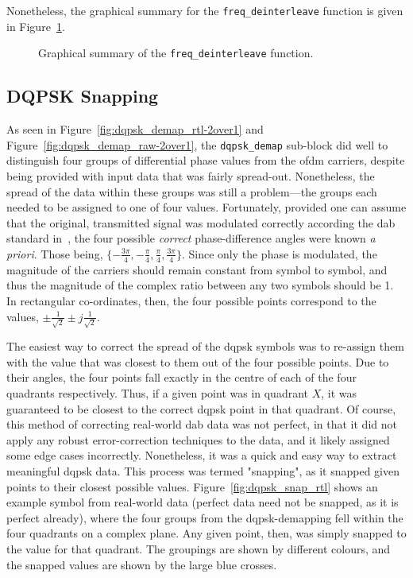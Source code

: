 \documentclass[class=report,11pt,crop=false]{standalone}
\begin{document}
Nonetheless, the graphical summary for the \texttt{freq\_deinterleave} function is given in Figure~\ref{fig:freq_deinterleave}.

\begin{figure}[htbp]
  \centering
  \captionsetup{type=figure}
  \def\svgwidth{\linewidth}
  { %
      }
  \caption{Graphical summary of the \texttt{freq\_deinterleave} function.}
  \label{fig:freq_deinterleave}
\end{figure}

\subsection{DQPSK Snapping \label{subsect:dab-proc_dqpsk-snap}}
As seen in Figure~\ref{fig:dqpsk_demap_rtl-2over1} and Figure~\ref{fig:dqpsk_demap_raw-2over1}, the \texttt{dqpsk\_demap} sub-block did well to distinguish four groups of differential phase values from the \gls{ofdm} carriers, despite being provided with input data that was fairly spread-out. Nonetheless, the spread of the data within these groups was still a problem---the groups each needed to be assigned to one of four values. Fortunately, provided one can assume that the original, transmitted signal was modulated correctly according the \gls{dab} standard in~\cite{dabstandard}, the four possible \emph{correct} phase-difference angles were known \emph{a priori}. Those being, \(\{-\frac{3\pi}{4}, -\frac{\pi}{4},\frac{\pi}{4}, \frac{3\pi}{4}\}\). Since only the phase is modulated, the magnitude of the carriers should remain constant from symbol to symbol, and thus the magnitude of the complex ratio between any two symbols should be 1. In rectangular co-ordinates, then, the four possible points correspond to the values, \(\pm \frac{1}{\sqrt{2}} \pm j\frac{1}{\sqrt{2}}\).

The easiest way to correct the spread of the \gls{dqpsk} symbols was to re-assign them with the value that was closest to them out of the four possible points. Due to their angles, the four points fall exactly in the centre of each of the four quadrants respectively. Thus, if a given point was in quadrant \(X\), it was guaranteed to be closest to the correct \gls{dqpsk} point in that quadrant. Of course, this method of correcting real-world \gls{dab} data was not perfect, in that it did not apply any robust error-correction techniques to the data, and it likely assigned some edge cases incorrectly. Nonetheless, it was a quick and easy way to extract meaningful \gls{dqpsk} data. This process was termed "snapping", as it snapped given points to their closest possible values. Figure~\ref{fig:dqpsk_snap_rtl} shows an example symbol from real-world data (perfect data need not be snapped, as it is perfect already), where the four groups from the \gls{dqpsk}-demapping fell within the four quadrants on a complex plane. Any given point, then, was simply snapped to the value for that quadrant. The groupings are shown by different colours, and the snapped values are shown by the large blue crosses.
\end{document}
